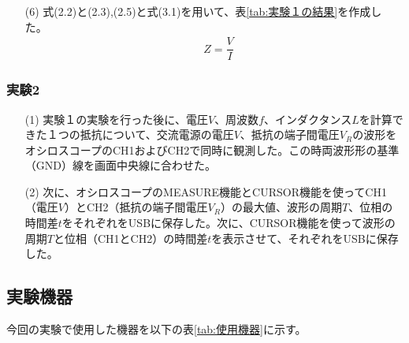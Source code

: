\documentclass[10pt,a4paper]{jsarticle}
\numberwithin{equation}{section}
\numberwithin{figure}{section}
\numberwithin{table}{section}
\begin{document}
    \begin{itemize}
      \item [(6)]式(2.2)と(2.3),(2.5)と式(3.1)を用いて、表\ref{tab:実験１の結果}を作成した。
      \begin{equation}
        \begin{split}
            &Z=\dfrac{V}{I}
        \end{split}
      \end{equation}
    \end{itemize}

  \subsubsection{実験2}
    \begin{itemize}
      \item [(1)]実験１の実験を行った後に、電圧$V$、周波数$f$、インダクタンス$L$を計算できた１つの抵抗について、交流電源の電圧$V$、抵抗の端子間電圧$V_R$の波形をオシロスコープのCH1およびCH2で同時に観測した。この時両波形形の基準（GND）線を画面中央線に合わせた。
      \item [(2)]次に、オシロスコープのMEASURE機能とCURSOR機能を使ってCH1（電圧$V$）とCH2（抵抗の端子間電圧$V_R$）の最大値、波形の周期$T$、位相の時間差$t$をそれぞれをUSBに保存した。次に、CURSOR機能を使って波形の周期$T$と位相（CH1とCH2）の時間差$t$を表示させて、それぞれをUSBに保存した。
    \end{itemize}

\newpage
\subsection{実験機器}
  今回の実験で使用した機器を以下の表\ref{tab:使用機器}に示す。
  \begin{table}[H]
  \caption{使用機器}\label{tab:使用機器}
  \begin{center}
  \end{center}
  \end{table}
  
\end{document}
